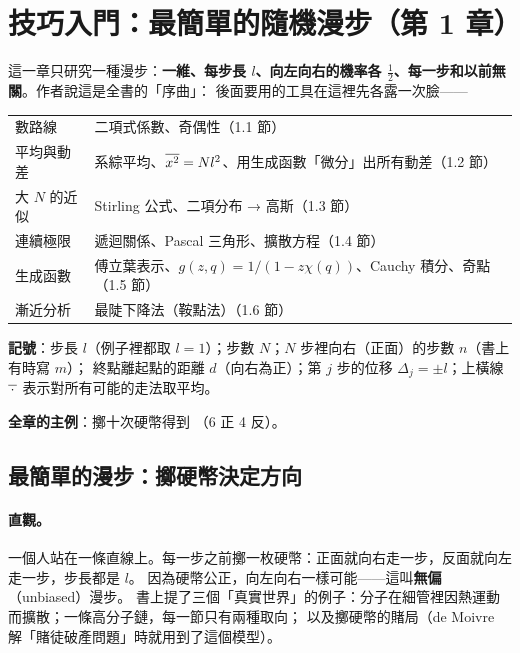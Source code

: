 

\section{技巧入門：最簡單的隨機漫步（第 1 章）}

\begin{keybox}[先看這裡]
這一章只研究一種漫步：\textbf{一維、每步長 $l$、向左向右的機率各 $\tfrac12$、每一步和以前無關}。作者說這是全書的「序曲」：
後面要用的工具在這裡先各露一次臉——
\begin{center}
\small
\begin{tabular}{@{}ll@{}}
數路線 & 二項式係數、奇偶性（1.1 節）\\
平均與動差 & 系綜平均、$\overline{x^2}=Nl^2$、用生成函數「微分」出所有動差（1.2 節）\\
大 $N$ 的近似 & Stirling 公式、二項分布 → 高斯（1.3 節）\\
連續極限 & 遞迴關係、Pascal 三角形、擴散方程（1.4 節）\\
生成函數 & 傅立葉表示、$g(z,q)=1/(1-z\chi(q))$、Cauchy 積分、奇點（1.5 節）\\
漸近分析 & 最陡下降法（鞍點法）（1.6 節）
\end{tabular}
\end{center}
\textbf{記號}：步長 $l$（例子裡都取 $l=1$）；步數 $N$；$N$ 步裡向右（正面）的步數 $n$（書上有時寫 $m$）；
終點離起點的距離 $d$（向右為正）；第 $j$ 步的位移 $\Delta_j=\pm l$；上橫線 $\overline{\,\cdot\,}$ 表示對所有可能的走法取平均。

\textbf{全章的主例}：擲十次硬幣得到 \coinH\coinT\coinH\coinH\coinT\coinH\coinT\coinT\coinH\coinH（6 正 4 反）。
\end{keybox}

\subsection{最簡單的漫步：擲硬幣決定方向}

\paragraph{直觀。}
一個人站在一條直線上。每一步之前擲一枚硬幣：正面就向右走一步，反面就向左走一步，步長都是 $l$。
因為硬幣公正，向左向右一樣可能——這叫\textbf{無偏}（unbiased）漫步。
書上提了三個「真實世界」的例子：分子在細管裡因熱運動而擴散；一條高分子鏈，每一節只有兩種取向；
以及擲硬幣的賭局（de Moivre 解「賭徒破產問題」時就用到了這個模型）。

